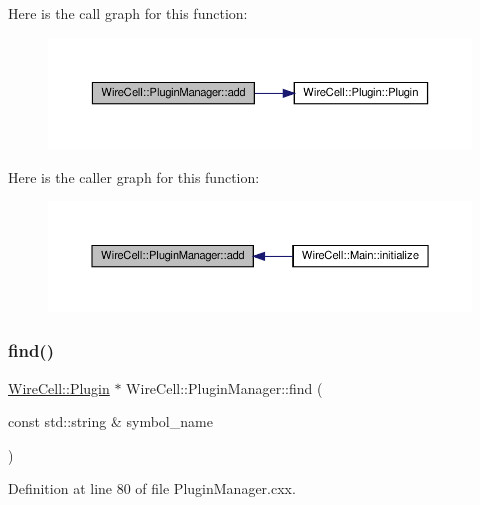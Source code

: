 Here is the call graph for this function\+:
\nopagebreak
\begin{figure}[H]
\begin{center}
\leavevmode
\includegraphics[width=350pt]{class_wire_cell_1_1_plugin_manager_a91f5a66757079562b579ef7eae374c6d_cgraph}
\end{center}
\end{figure}
Here is the caller graph for this function\+:
\nopagebreak
\begin{figure}[H]
\begin{center}
\leavevmode
\includegraphics[width=350pt]{class_wire_cell_1_1_plugin_manager_a91f5a66757079562b579ef7eae374c6d_icgraph}
\end{center}
\end{figure}
\mbox{\label{class_wire_cell_1_1_plugin_manager_ad83fad032405351bde15ad4abeeef819}} 
\subsubsection{\texorpdfstring{find()}{find()}}
{\footnotesize\ttfamily \hyperlink{class_wire_cell_1_1_plugin}{Wire\+Cell\+::\+Plugin} $\ast$ Wire\+Cell\+::\+Plugin\+Manager\+::find (\begin{DoxyParamCaption}\item[{const std\+::string \&}]{symbol\+\_\+name }\end{DoxyParamCaption})}



Definition at line 80 of file Plugin\+Manager.\+cxx.

